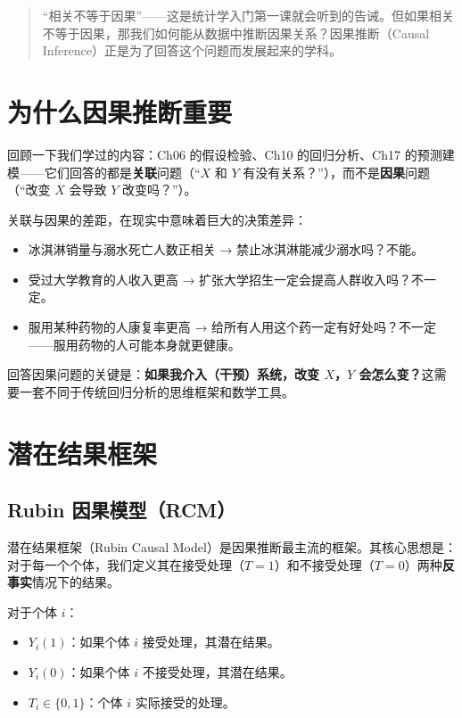 \documentclass[
]{book}
\providecommand{\tightlist}{%
  \setlength{\itemsep}{0pt}\setlength{\parskip}{0pt}}
\begin{document}
\begin{quote}
``相关不等于因果''------这是统计学入门第一课就会听到的告诫。但如果相关不等于因果，那我们如何能从数据中推断因果关系？因果推断（Causal Inference）正是为了回答这个问题而发展起来的学科。
\end{quote}

\section{为什么因果推断重要}\label{ux4e3aux4ec0ux4e48ux56e0ux679cux63a8ux65adux91cdux8981}

回顾一下我们学过的内容：Ch06 的假设检验、Ch10 的回归分析、Ch17 的预测建模------它们回答的都是\textbf{关联}问题（``\(X\) 和 \(Y\) 有没有关系？''），而不是\textbf{因果}问题（``改变 \(X\) 会导致 \(Y\) 改变吗？''）。

关联与因果的差距，在现实中意味着巨大的决策差异：

\begin{itemize}
\tightlist
\item
  冰淇淋销量与溺水死亡人数正相关 → 禁止冰淇淋能减少溺水吗？不能。
\item
  受过大学教育的人收入更高 → 扩张大学招生一定会提高人群收入吗？不一定。
\item
  服用某种药物的人康复率更高 → 给所有人用这个药一定有好处吗？不一定------服用药物的人可能本身就更健康。
\end{itemize}

回答因果问题的关键是：\textbf{如果我介入（干预）系统，改变 \(X\)，\(Y\) 会怎么变？}这需要一套不同于传统回归分析的思维框架和数学工具。

\section{潜在结果框架}\label{ux6f5cux5728ux7ed3ux679cux6846ux67b6}

\subsection{Rubin 因果模型（RCM）}\label{rubin-ux56e0ux679cux6a21ux578brcm}

潜在结果框架（Rubin Causal Model）是因果推断最主流的框架。其核心思想是：对于每一个个体，我们定义其在接受处理（\(T=1\)）和不接受处理（\(T=0\)）两种\textbf{反事实}情况下的结果。

对于个体 \(i\)：

\begin{itemize}
\tightlist
\item
  \(Y_i(1)\)：如果个体 \(i\) 接受处理，其潜在结果。
\item
  \(Y_i(0)\)：如果个体 \(i\) 不接受处理，其潜在结果。
\item
  \(T_i \in \{0, 1\}\)：个体 \(i\) 实际接受的处理。
\end{itemize}
\end{document}
